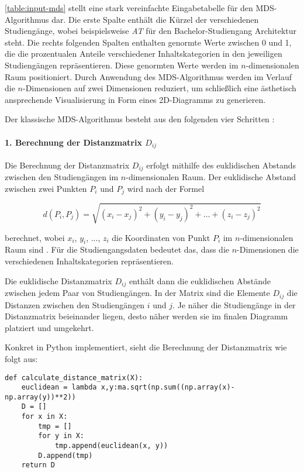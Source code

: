 \autoref{table:input-mds} stellt eine stark vereinfachte Eingabetabelle für den MDS-Algorithmus dar. Die erste Spalte enthält die Kürzel der verschiedenen Studiengänge, wobei beispielsweise \textit{AT} für den Bachelor-Studiengang Architektur steht. Die rechts folgenden Spalten enthalten genormte Werte zwischen 0 und 1, die die prozentualen Anteile verschiedener Inhaltskategorien in den jeweiligen Studiengängen repräsentieren. Diese genormten Werte werden im $n$-dimensionalen Raum positioniert. Durch Anwendung des MDS-Algorithmus werden im Verlauf die $n$-Dimensionen auf zwei Dimensionen reduziert, um schließlich eine ästhetisch ansprechende Visualisierung in Form eines 2D-Diagramms zu generieren.

\noindent
Der klassische MDS-Algorithmus besteht aus den folgenden vier Schritten
\parencite{imperial_multidimensional_2019}:

\paragraph*{1. Berechnung der Distanzmatrix $ D_{ij} $}\label{sec:distanzmatrix}
Die Berechnung der Distanzmatrix $ D_{ij} $ erfolgt mithilfe des euklidischen
Abstands zwischen den Studiengängen im $n$-dimensionalen Raum. Der euklidische
Abstand zwischen zwei Punkten $ P_{i} $ und $ P_{j} $ wird nach der Formel

$$ d(P_i, P_j) = \sqrt{(x_i - x_j)^2 + (y_i - y_j)^2 + \ldots + (z_i - z_j)^2} $$

berechnet, wobei $ x_{i} $, $ y_{i} $, ..., $ z_{i} $ die Koordinaten von Punkt
$ P_{i} $ im $n$-dimensionalen Raum sind \parencite{ceopedia_multidimensional_2018}. Für die
Studiengangsdaten bedeutet das, dass die $n$-Dimensionen die verschiedenen
Inhaltskategorien repräsentieren.

Die euklidische Distanzmatrix $ D_{ij} $ enthält dann die euklidischen Abstände
zwischen jedem Paar von Studiengängen. In der Matrix sind die Elemente
$ D_{ij} $ die Distanzen zwischen den Studiengängen $ i $ und $ j $. Je näher
die Studiengänge in der Distanzmatrix beieinander liegen, desto näher werden sie
im finalen Diagramm platziert und umgekehrt.

Konkret in Python implementiert, sieht die Berechnung der Distanzmatrix wie
folgt aus:

\begin{lstlisting}[style=Python]
def calculate_distance_matrix(X):
    euclidean = lambda x,y:ma.sqrt(np.sum((np.array(x)-np.array(y))**2))
    D = []
    for x in X:
        tmp = []
        for y in X:
            tmp.append(euclidean(x, y))
        D.append(tmp)
    return D
\end{lstlisting}

